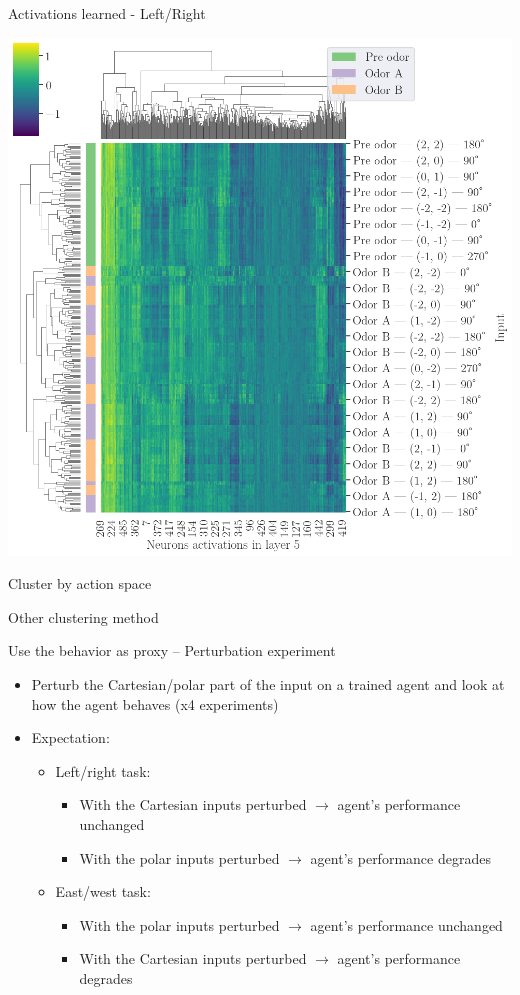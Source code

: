 \documentclass[bigger]{beamer}
\begin{document}
\begin{frame}[label={sec:orge4768e5}]{Activations learned - Left/Right}
\begin{center}
\includegraphics[height=0.9\textheight]{img/activations-learned-LeftRight.png}
\end{center}
\end{frame}
\begin{frame}[label={sec:org83483aa}]{Cluster by action space}
\end{frame}
\begin{frame}[label={sec:org303b966}]{Other clustering method}
\end{frame}
\begin{frame}[<+->][label={sec:org43cf319}]{Use the behavior as proxy -- Perturbation experiment}
\begin{itemize}
\item Perturb the Cartesian/polar part of the input on a trained agent and look at how the agent behaves (x4 experiments)
\item Expectation:
\begin{itemize}
\item Left/right task:
\begin{itemize}
\item With the \alert{Cartesian} inputs perturbed \(\to\) agent's performance unchanged
\item With the \alert{polar} inputs perturbed \(\to\) agent's performance degrades
\end{itemize}
\item East/west task:
\begin{itemize}
\item With the \alert{polar} inputs perturbed \(\to\) agent's performance unchanged
\item With the \alert{Cartesian} inputs perturbed \(\to\) agent's performance degrades
\end{itemize}
\end{itemize}
\end{itemize}
\end{frame}
\end{document}
